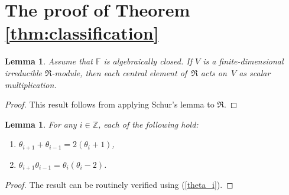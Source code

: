 \documentclass[11pt]{article}
\numberwithin{equation}{section}
\def\F{\mathbb F}
\def\Z{\mathbb Z}
\numberwithin{equation}{section}
\newtheorem{Lemma}[Theorem]{Lemma}
\begin{document}
\setcounter{section}{5}
\section{The proof of Theorem \ref{thm:classification}}\label{s:proof}


\begin{Lemma}\label{lem:Schur}Assume that $\F$ is algebraically closed. If $V$ is a finite-dimensional irreducible $\Re$-module, then each central element of~$\Re$ acts on~$V$ as scalar multiplication.
\end{Lemma}
\begin{proof}This result follows from applying Schur's lemma to $\Re$.
\end{proof}

\begin{Lemma}\label{lem:theta}For any $i\in \Z$, each of the following hold:
\begin{enumerate}\itemsep=0pt
\item[$(i)$] $\theta_{i+1}+\theta_{i-1}=2(\theta_i+1)$,
\item[$(ii)$] $\theta_{i+1}\theta_{i-1}=\theta_i(\theta_i-2)$.
\end{enumerate}
\end{Lemma}
\begin{proof}The result can be routinely verified using (\ref{theta_i}).
\end{proof}
\end{document}
